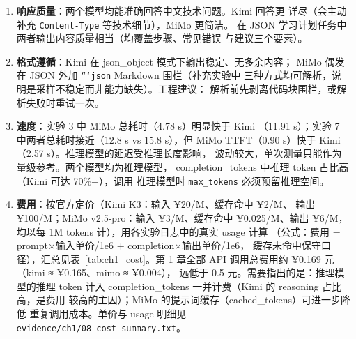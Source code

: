 \begin{enumerate}[leftmargin=4em,itemsep=0pt,topsep=2pt]
    \item \textbf{响应质量}：两个模型均能准确回答中文技术问题。Kimi 回答更
          详尽（会主动补充 \texttt{Content-Type} 等技术细节），MiMo 更简洁。
          在 JSON 学习计划任务中两者输出内容质量相当（均覆盖步骤、常见错误
          与建议三个要素）。
    \item \textbf{格式遵循}：Kimi 在 json\_object 模式下输出稳定、无多余内容；
          MiMo 偶发在 JSON 外加 \texttt{```json} Markdown 围栏（补充实验中
          三种方式均可解析，说明是采样不稳定而非能力缺失）。工程建议：
          解析前先剥离代码块围栏，或解析失败时重试一次。
    \item \textbf{速度}：实验 3 中 MiMo 总耗时（4.78 s）明显快于 Kimi
          （11.91 s）；实验 7 中两者总耗时接近（12.8 s vs 15.8 s），但 MiMo
          TTFT（0.90 s）快于 Kimi（2.57 s）。推理模型的延迟受推理长度影响，
          波动较大，单次测量只能作为量级参考。两个模型均为推理模型，
          completion\_tokens 中推理 token 占比高（Kimi 可达 70\%+），调用
          推理模型时 \texttt{max\_tokens} 必须预留推理空间。
    \item \textbf{费用}：按官方定价（Kimi K3：输入 ¥20/M、缓存命中 ¥2/M、
          输出 ¥100/M；MiMo v2.5-pro：输入 ¥3/M、缓存命中 ¥0.025/M、输出
          ¥6/M，均以每 1M tokens 计），用各实验日志中的真实 usage 计算
          （公式：费用 = prompt×输入单价/1e6 + completion×输出单价/1e6，
          缓存未命中保守口径），汇总见表~\ref{tab:ch1_cost}。第 1 章全部
          API 调用总费用约 ¥0.169 元（kimi ≈ ¥0.165、mimo ≈ ¥0.004），
          远低于 0.5 元。需要指出的是：推理模型的推理 token 计入
          completion\_tokens 一并计费（Kimi 的 reasoning 占比高，是费用
          较高的主因）；MiMo 的提示词缓存（cached\_tokens）可进一步降低
          重复调用成本。单价与 usage 明细见 \nolinkurl{evidence/ch1/08_cost_summary.txt}。


\end{enumerate}
